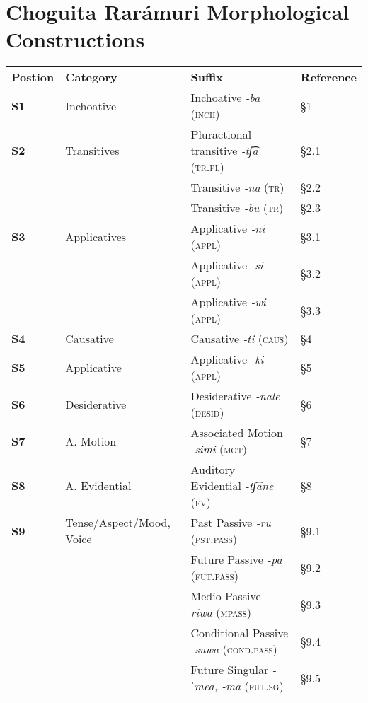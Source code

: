 \appendix
\chapter{Choguita Rarámuri Morphological Constructions}


\begin{tabularx}{\textwidth}{XXXX}
\lsptoprule
 \textbf{Postion} & \textbf{Category} & { \textbf{Suffix}} & \textbf{Reference}\\
 \textbf{S1} & Inchoative & Inchoative \textit{{}-ba} (\textsc{inch}) & §1\\
 \textbf{S2} & Transitives & Pluractional transitive \textit{-tʃ͡}\textit{a} (\textsc{tr.pl}) & §2.1\\
\hhline{~~--} &  & Transitive \textit{{}-na} (\textsc{tr}) & §2.2\\
\hhline{~~--} &  & Transitive \textit{{}-bu} (\textsc{tr}) & §2.3\\
 \textbf{S3} & Applicatives & Applicative \textit{{}-ni} (\textsc{appl}) & §3.1\\
&  & Applicative \textit{{}-si} (\textsc{appl}) & §3.2\\
&  & Applicative \textit{{}-wi} (\textsc{appl}) & §3.3\\
 \textbf{S4} & Causative & Causative \textit{{}-ti} (\textsc{caus}) & §4\\
 \textbf{S5} & Applicative & Applicative \textit{{}-ki} (\textsc{appl}) & §5\\
 \textbf{S6} & Desiderative & Desiderative \textit{{}-nale} (\textsc{desid}) & §6\\
 \textbf{S7} & A. Motion & Associated Motion \textit{{}-simi} (\textsc{mot}) & §7\\
 \textbf{S8} & A. Evidential & Auditory Evidential \textit{{}-tʃ͡ane} (\textsc{ev}) & §8\\
 \textbf{S9} & Tense/Aspect/Mood, Voice & Past Passive \textit{{}-ru} (\textsc{pst.pass}) & §9.1\\
&  & Future Passive \textit{-pa} (\textsc{fut.pass}) & §9.2\\
&  & Medio-Passive \textit{{}-riwa} (\textsc{mpass}) & §9.3\\
&  & Conditional Passive \textit{-suwa} (\textsc{cond.pass}) & §9.4\\
&  & Future Singular \textit{-ˈmea, -ma} (\textsc{fut.sg}) & §9.5\\

\end{tabularx}

